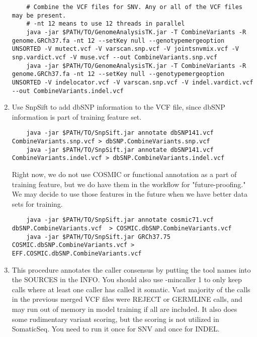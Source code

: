 \documentclass[10pt,letterpaper]{article}
\begin{document}
\begin{sloppypar}
\begin{enumerate}
	\begin{lstlisting}
	# Combine the VCF files for SNV. Any or all of the VCF files may be present.
	# -nt 12 means to use 12 threads in parallel
	java -jar $PATH/TO/GenomeAnalysisTK.jar -T CombineVariants -R genome.GRCh37.fa -nt 12 --setKey null --genotypemergeoption UNSORTED -V mutect.vcf -V varscan.snp.vcf -V jointsnvmix.vcf -V snp.vardict.vcf -V muse.vcf --out CombineVariants.snp.vcf
	java -jar $PATH/TO/GenomeAnalysisTK.jar -T CombineVariants -R genome.GRCh37.fa -nt 12 --setKey null --genotypemergeoption UNSORTED -V indelocator.vcf -V varscan.snp.vcf -V indel.vardict.vcf --out CombineVariants.indel.vcf
	\end{lstlisting}
	
	
	\item
	Use SnpSift to add dbSNP information to the VCF file, since dbSNP information is part of training feature set.
	
	\begin{lstlisting}
	java -jar $PATH/TO/SnpSift.jar annotate dbSNP141.vcf CombineVariants.snp.vcf > dbSNP.CombineVariants.snp.vcf
	java -jar $PATH/TO/SnpSift.jar annotate dbSNP141.vcf CombineVariants.indel.vcf > dbSNP.CombineVariants.indel.vcf
	\end{lstlisting}
	
	Right now, we do not use COSMIC or functional annotation as a part of training feature, but we do have them in the workflow for "future-proofing." We may decide to use those features in the future when we have better data sets for training. 
	
	\begin{lstlisting}
	java -jar $PATH/TO/SnpSift.jar annotate cosmic71.vcf dbSNP.CombineVariants.vcf  > COSMIC.dbSNP.CombineVariants.vcf
	java -jar $PATH/TO/SnpSift.jar GRCh37.75 COSMIC.dbSNP.CombineVariants.vcf > EFF.COSMIC.dbSNP.CombineVariants.vcf
	\end{lstlisting}
	
	
	\item
	This procedure annotates the caller consensus by putting the tool names into the SOURCES in the INFO. You should also use -mincaller 1 to only keep calls where at least one caller has called it somatic. Vast majority of the calls in the previous merged VCF files were REJECT or GERMLINE calls, and may run out of memory in model training if all are included. It also does some rudimentary variant scoring, but the scoring is not utilized in SomaticSeq. You need to run it once for SNV and once for INDEL. 
	

\end{enumerate}
\end{sloppypar}
\end{document}
